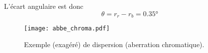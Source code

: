 \documentclass[../TDO1-O2.tex]{subfiles}%
\begin{document}
{	L'écart angulaire est donc
	\[\boxed{\theta = r_r - r_b = \ang{0.35;;}}\]

	\begin{figure}[h]
		\centering
		\texttt{[image: abbe\_chroma.pdf]}
		\captionsetup{justification=centering}
		\caption{Exemple (exagéré) de dispersion (aberration chromatique).}
		\label{fig:aberr}
	\end{figure}
}%
\end{document}
